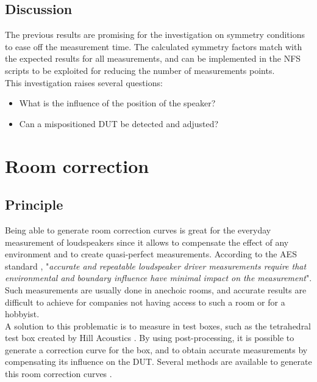 \documentclass{report}
\begin{document}
\section{Discussion}

The previous results are promising for the investigation on symmetry conditions to ease off the measurement time. The calculated symmetry factors match with the expected results for all measurements, and can be implemented in the NFS scripts to be exploited for reducing the number of measurements points. \\
This investigation raises several questions: 
\begin{itemize}
	\item What is the influence of the position of the speaker?
	\item Can a mispositioned DUT be detected and adjusted?
\end{itemize}

\chapter{Room correction}

\section{Principle}

Being able to generate room correction curves is great for the everyday measurement of loudspeakers since it allows to compensate the effect of any environment and to create quasi-perfect measurements. According to the AES standard \cite{aesstandart}, "\textit{accurate and repeatable loudspeaker driver measurements require that environmental and boundary influence have minimal impact on the measurement}". Such measurements are usually done in anechoic rooms, and accurate results are difficult to achieve for companies not having access to such a room or for a hobbyist. \\

A solution to this problematic is to measure in test boxes, such as the tetrahedral test box created by Hill Acoustics \citep[see][]{tetbox}. By using post-processing, it is possible to generate a correction curve for the box, and to obtain accurate measurements by compensating its influence on the DUT. Several methods are available to generate this room correction curves \citep[see][]{aeswb}.\\
\end{document}
